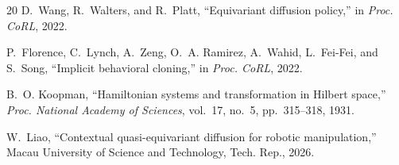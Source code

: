 \documentclass[twocolumn]{article}
\begin{document}
\begin{thebibliography}{20}
D.~Wang, R.~Walters, and R.~Platt, ``Equivariant diffusion policy,'' in \textit{Proc. CoRL}, 2022.

P.~Florence, C.~Lynch, A.~Zeng, O.~A. Ramirez, A.~Wahid, L.~Fei-Fei, and S.~Song, ``Implicit behavioral cloning,'' in \textit{Proc. CoRL}, 2022.

B.~O. Koopman, ``Hamiltonian systems and transformation in Hilbert space,'' \textit{Proc. National Academy of Sciences}, vol.~17, no.~5, pp.~315--318, 1931.

W.~Liao, ``Contextual quasi-equivariant diffusion for robotic manipulation,'' Macau University of Science and Technology, Tech. Rep., 2026.

\end{thebibliography}
\end{document}
